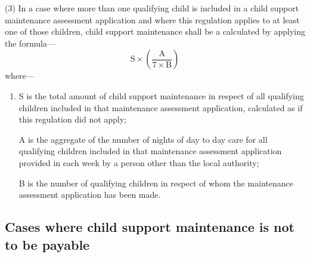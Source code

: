 \documentclass[12pt,a4paper]{article}
\begin{document}
(3) In a case where more than one qualifying child is included in a child support maintenance assessment application and where this regulation applies to at least one of those children, child support maintenance shall be a calculated by applying the formula—
\[ \mathrm{S} \times \left( \frac{\mathrm{A}}{7 \times \mathrm{B}} \right)  \]
where—
\begin{enumerate}\item[]
S is the total amount of child support maintenance in respect of all qualifying children included in that maintenance assessment application, calculated as if this regulation did not apply;

A is the aggregate of the number of nights of day to day care for all qualifying children included in that maintenance assessment application provided in each week by a person other than the local authority;

B is the number of qualifying children in respect of whom the maintenance assessment application has been made.
\end{enumerate}


\subsection[26. Cases where child support maintenance is not to be payable]{Cases where child support maintenance is not to be payable}
\end{document}
